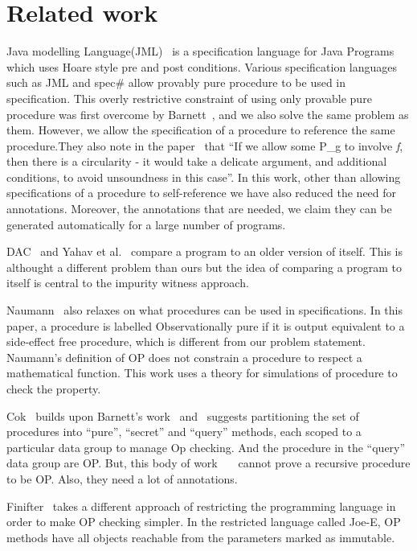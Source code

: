 \section{Related work}\label{sec:related}
Java modelling Language(JML)~\cite{leavens2008jml} is a specification
language for Java Programs which uses Hoare style pre and post
conditions. Various specification languages such as JML and spec\#
allow provably pure procedure to be used in specification.
This overly restrictive constraint of using only provable pure
procedure was first overcome by Barnett~\cite{barnett200499}, and we
also solve the same problem as them. However, we allow the
specification of a procedure to reference the same procedure.They also
note in the paper~\cite{barnett200499} that ``If we allow some P_g to
involve \textit{f}, then there is a circularity - it would take a
delicate argument, and additional conditions, to avoid unsoundness in
this case''. In this work, other than allowing specifications of a
procedure to self-reference we have also reduced the need for
annotations. Moreover, the annotations that are needed, we claim they
can be generated automatically for a large number of programs.


DAC~\cite{lahiri2013differential} and Yahav et
al.~\cite{partush2013abstract} compare a program to an older version
of itself. This is althought a different problem than ours but the
idea of comparing a program to itself is central to the impurity
witness approach.

Naumann~\cite{naumann2007observational} also relaxes on what
procedures can be used in specifications. In this paper, a procedure
is labelled Observationally pure if it is output equivalent to a
side-effect free procedure, which is different from our problem
statement. Naumann's definition of OP does not constrain a procedure
to respect a mathematical function. This work uses a theory for
simulations of procedure to check the property.

Cok~\cite{cok2008extensions} builds upon Barnett's
work~\cite{barnett2006allowing} and~\cite{barnett200499} suggests
partitioning the set of procedures into ``pure'', ``secret'' and
``query'' methods, each scoped to a particular data group to manage Op
checking. And the procedure in the ``query'' data group are OP.  But,
this body of
work~\cite{cok2008extensions}~\cite{barnett2006allowing}~\cite{barnett200499}
cannot prove a recursive procedure to be OP. Also, they need a lot of
annotations.

Finifter~\cite{cok2008extensions} takes a different approach of
restricting the programming language in order to make OP checking
simpler. In the restricted language called Joe-E, OP methods have all
objects reachable from the parameters marked as immutable.

